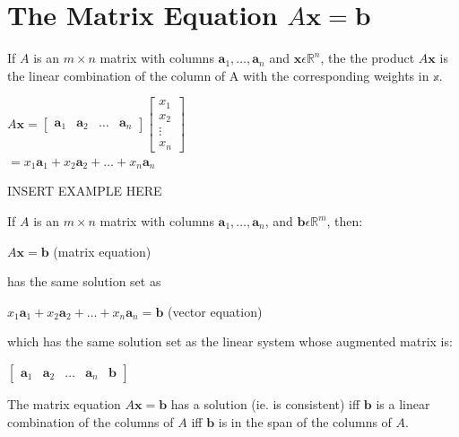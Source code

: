 \documentclass{report}
\begin{document}
\section{The Matrix Equation $A\mathbf{x}=\mathbf{b}$}
\begin{definition}
	If $A$ is an $m\times n$ matrix with columns $\mathbf{a}_1,\ldots, \mathbf{a}_n$ and $\mathbf{x}\epsilon \mathbb{R}^n$, the the product $A\mathbf{x}$ is the linear combination of the column of A with the corresponding weights in $\mathbb{x}$.
	\begin{center}
		$A\mathbf{x} = \begin{bmatrix} \mathbf{a}_1 & \mathbf{a}_2 & \ldots & \mathbf{a}_n \end{bmatrix}\begin{bmatrix}
			x_1 \\
			x_2 \\
			\vdots \\
			x_n
		\end{bmatrix}$\\\vspace{3mm}
		$=x_1\mathbf{a}_1 + x_2\mathbf{a}_2 + \ldots + x_n\mathbf{a}_n$
	\end{center}
\end{definition}
\begin{center}
	INSERT EXAMPLE HERE
\end{center}
\begin{theorem}
	If $A$ is an $m\times n$ matrix with columns $\mathbf{a}_1,\ldots, \mathbf{a}_n$, and $\mathbf{b}\epsilon \mathbb{R}^m$, then:
	\begin{center}
		$A\mathbf{x}=\mathbf{b}$ (matrix equation)
	\end{center}
	has the same solution set as
	\begin{center}
		$x_1\mathbf{a}_1 + x_2\mathbf{a}_2 + \ldots + x_n\mathbf{a}_n = \mathbf{b}$ (vector equation)
	\end{center}
	which has the same solution set as the linear system whose augmented matrix is:
	\begin{center}
		$\begin{bmatrix} \mathbf{a}_1 & \mathbf{a}_2 & \ldots & \mathbf{a}_n & \mathbf{b} \end{bmatrix}$
	\end{center}
\end{theorem}
\begin{proposition}
	The matrix equation $A\mathbf{x}=\mathbf{b}$ has a solution (ie. is consistent) iff $\mathbf{b}$ is a linear combination of the columns of $A$ iff $\mathbf{b}$ is in the span of the columns of $A$.
\end{proposition}
\end{document}
